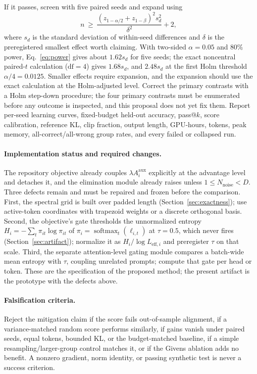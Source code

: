 \documentclass{article}
\begin{document}
If it passes, screen with five paired seeds and expand using
\begin{equation}
 n\ \geq\ \frac{(z_{1-\alpha/2}+z_{1-\beta})^2s_d^2}{\delta^2}+2,
 \label{eq:power}
\end{equation}
where $s_d$ is the standard deviation of within-seed differences and $\delta$
is the preregistered smallest effect worth claiming.  With two-sided
$\alpha=0.05$ and $80\%$ power, Eq.~\eqref{eq:power} gives about $1.62s_d$ for
five seeds; the exact noncentral paired-$t$ calculation ($\mathrm{df}=4$) gives
$1.68s_d$, and $2.48s_d$ at the first Holm threshold $\alpha/4=0.0125$.  Smaller
effects require expansion, and the expansion should use the exact calculation
at the Holm-adjusted level.  Correct the primary contrasts with a Holm
step-down procedure; the four primary contrasts must be enumerated before any
outcome is inspected, and this proposal does not yet fix them.  Report
per-seed learning curves, fixed-budget held-out accuracy, pass@$k$, score
calibration, reference KL, clip fraction, output length, GPU-hours, tokens,
peak memory, all-correct/all-wrong group rates, and every failed or collapsed
run.

\paragraph{Implementation status and required changes.}
The repository objective already couples $\lambda A_i^{\mathrm{aux}}$
explicitly at the advantage level and detaches it, and the elimination module
already raises unless $1\leq N_{\mathrm{noise}}<D$.  Three defects remain and
must be repaired and frozen before the comparison.  First, the spectral grid is
built over padded length (Section~\ref{sec:exactness}); use active-token
coordinates with trapezoid weights or a discrete orthogonal basis.  Second, the
objective's gate thresholds the unnormalized entropy
$H_i=-\sum_t\pi_{it}\log\pi_{it}$ of $\pi_i=\operatorname{softmax}_t(\ell_{i,t})$
at $\tau=0.5$, which never fires (Section~\ref{sec:artifact}); normalize it as
$H_i/\log L_{\mathrm{eff},i}$ and preregister $\tau$ on that scale.  Third, the
separate attention-level gating module compares a batch-wide mean entropy with
$\tau$, coupling unrelated prompts; compute that gate per head or token.  These
are the specification of the proposed method; the present artifact is the
prototype with the defects above.

\paragraph{Falsification criteria.}
Reject the mitigation claim if the score fails out-of-sample alignment, if a
variance-matched random score performs similarly, if gains vanish under paired
seeds, equal tokens, bounded KL, or the budget-matched baseline, if a simple
resampling/larger-group control matches it, or if the Givens ablation adds no
benefit.  A nonzero gradient, norm identity, or passing synthetic test is never
a success criterion.
\end{document}
